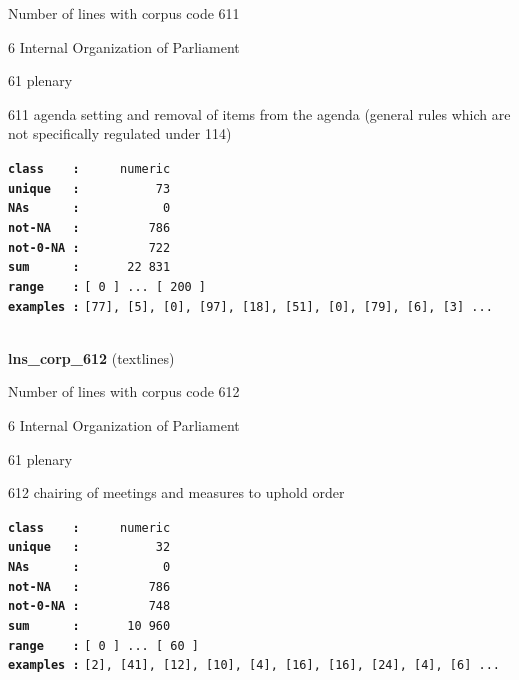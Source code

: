 \documentclass[]{article}
\begin{document}
Number of lines with corpus code 611

6 Internal Organization of Parliament

61 plenary

611 agenda setting and removal of items from the agenda (general rules
which are not specifically regulated under 114)

\textbf{\texttt{class\ \ \ \ :}} \texttt{~~~~~numeric}\\
\textbf{\texttt{unique\ \ \ :}} \texttt{~~~~~~~~~~73}\\
\textbf{\texttt{NAs\ \ \ \ \ \ :}} \texttt{~~~~~~~~~~~0}\\
\textbf{\texttt{not-NA\ \ \ :}} \texttt{~~~~~~~~~786}\\
\textbf{\texttt{not-0-NA\ :}} \texttt{~~~~~~~~~722}\\
\textbf{\texttt{sum\ \ \ \ \ \ :}} \texttt{~~~~~~22~831}\\
\textbf{\texttt{range\ \ \ \ :}}
\texttt{{[}\ 0\ {]}\ ...\ {[}\ 200\ {]}}\\
\textbf{\texttt{examples\ :}}
\texttt{{[}77{]},\ {[}5{]},\ {[}0{]},\ {[}97{]},\ {[}18{]},\ {[}51{]},\ {[}0{]},\ {[}79{]},\ {[}6{]},\ {[}3{]}\ ...}\\

~

\textbf{lns\_corp\_612} (textlines)

Number of lines with corpus code 612

6 Internal Organization of Parliament

61 plenary

612 chairing of meetings and measures to uphold order

\textbf{\texttt{class\ \ \ \ :}} \texttt{~~~~~numeric}\\
\textbf{\texttt{unique\ \ \ :}} \texttt{~~~~~~~~~~32}\\
\textbf{\texttt{NAs\ \ \ \ \ \ :}} \texttt{~~~~~~~~~~~0}\\
\textbf{\texttt{not-NA\ \ \ :}} \texttt{~~~~~~~~~786}\\
\textbf{\texttt{not-0-NA\ :}} \texttt{~~~~~~~~~748}\\
\textbf{\texttt{sum\ \ \ \ \ \ :}} \texttt{~~~~~~10~960}\\
\textbf{\texttt{range\ \ \ \ :}}
\texttt{{[}\ 0\ {]}\ ...\ {[}\ 60\ {]}}\\
\textbf{\texttt{examples\ :}}
\texttt{{[}2{]},\ {[}41{]},\ {[}12{]},\ {[}10{]},\ {[}4{]},\ {[}16{]},\ {[}16{]},\ {[}24{]},\ {[}4{]},\ {[}6{]}\ ...}\\
\end{document}
